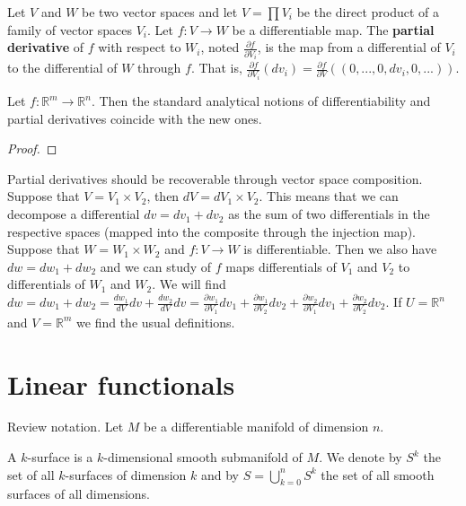 \begin{defn}
	Let $V$ and $W$ be two vector spaces and let $V=\prod V_i$ be the direct product of a family of vector spaces $V_i$. Let $f: V \to W$ be a differentiable map. The \textbf{partial derivative} of $f$ with respect to $W_i$, noted $\frac{\partial f}{\partial V_i}$, is the map from a differential of $V_i$ to the differential of $W$ through $f$. That is, $\frac{\partial f}{\partial V_i} (dv_i) = \frac{\partial f}{\partial V} \left( (0, ..., 0, dv_i, 0, ...) \right)$.
\end{defn}

\begin{prop}
	Let $f:\mathbb{R}^m \to \mathbb{R}^n$. Then the standard analytical notions of differentiability and partial derivatives coincide with the new ones.
\end{prop}

\begin{proof}
\end{proof}


\begin{remark}
	Partial derivatives should be recoverable through vector space composition. Suppose that $V = V_1 \times V_2$, then $dV = dV_1 \times V_2$. This means that we can decompose a differential $dv= dv_1 + dv_2$ as the sum of two differentials in the respective spaces (mapped into the composite through the injection map). Suppose that $W = W_1 \times W_2$ and $f : V \to W$ is differentiable. Then we also have $dw= dw_1 + dw_2$ and we can study of $f$ maps differentials of $V_1$ and $V_2$ to differentials of $W_1$ and $W_2$. We will find $dw = dw_1 + dw_2 = \frac{dw_1}{dV} dv + \frac{dw_2}{dV} dv = \frac{\partial w_1}{\partial V_1} dv_1 + \frac{\partial w_1}{\partial V_2} dv_2 + \frac{\partial w_2}{\partial V_1} dv_1 + \frac{\partial w_2}{\partial V_2} dv_2$. If $U = \mathbb{R}^n$ and $V = \mathbb{R}^m$ we find the usual definitions.
\end{remark}


\section{Linear functionals}

Review notation. Let $M$ be a differentiable manifold of dimension $n$.

\begin{defn}
	A $k$-surface is a $k$-dimensional smooth submanifold of $M$. We denote by $S^k$ the set of all  $k$-surfaces of dimension $k$ and by $S = \bigcup_{k=0}^n S^k$ the set of all smooth surfaces of all dimensions.
\end{defn}

